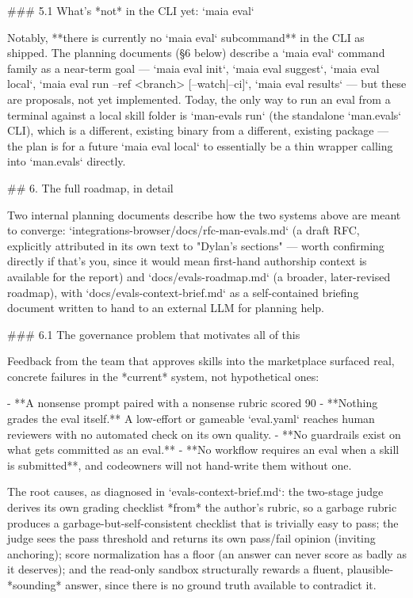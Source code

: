 ### 5.1 What's *not* in the CLI yet: `maia eval`

Notably, **there is currently no `maia eval` subcommand** in the CLI as shipped. The planning documents (§6 below) describe a `maia eval` command family as a near-term goal — `maia eval init`, `maia eval suggest`, `maia eval local`, `maia eval run --ref <branch> [--watch|--ci]`, `maia eval results` — but these are proposals, not yet implemented. Today, the only way to run an eval from a terminal against a local skill folder is `man-evals run` (the standalone `man.evals` CLI), which is a different, existing binary from a different, existing package — the plan is for a future `maia eval local` to essentially be a thin wrapper calling into `man.evals` directly.

## 6. The full roadmap, in detail

Two internal planning documents describe how the two systems above are meant to converge: `integrations-browser/docs/rfc-man-evals.md` (a draft RFC, explicitly attributed in its own text to "Dylan's sections" — worth confirming directly if that's you, since it would mean first-hand authorship context is available for the report) and `docs/evals-roadmap.md` (a broader, later-revised roadmap), with `docs/evals-context-brief.md` as a self-contained briefing document written to hand to an external LLM for planning help.

### 6.1 The governance problem that motivates all of this

Feedback from the team that approves skills into the marketplace surfaced real, concrete failures in the *current* system, not hypothetical ones:

- **A nonsense prompt paired with a nonsense rubric scored 90%
- **Nothing grades the eval itself.** A low-effort or gameable `eval.yaml` reaches human reviewers with no automated check on its own quality.
- **No guardrails exist on what gets committed as an eval.**
- **No workflow requires an eval when a skill is submitted**, and codeowners will not hand-write them without one.

The root causes, as diagnosed in `evals-context-brief.md`: the two-stage judge derives its own grading checklist *from* the author's rubric, so a garbage rubric produces a garbage-but-self-consistent checklist that is trivially easy to pass; the judge sees the pass threshold and returns its own pass/fail opinion (inviting anchoring); score normalization has a floor (an answer can never score as badly as it deserves); and the read-only sandbox structurally rewards a fluent, plausible-*sounding* answer, since there is no ground truth available to contradict it.

